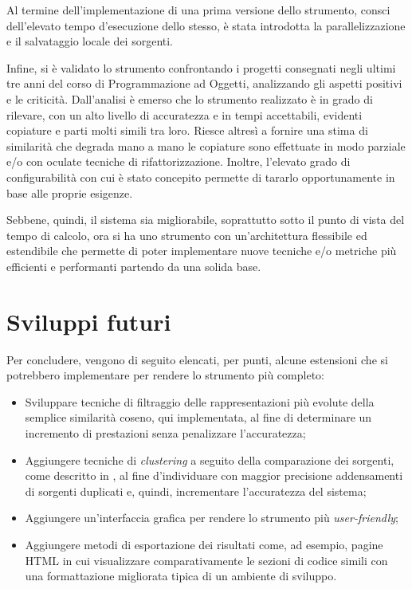 Al termine dell'implementazione di una prima versione dello strumento, consci dell'elevato tempo d'esecuzione dello stesso, è stata introdotta la parallelizzazione e il salvataggio locale dei sorgenti.

Infine, si è validato lo strumento confrontando i progetti consegnati negli ultimi tre anni del corso di Programmazione ad Oggetti, analizzando gli aspetti positivi e le criticità. 
%
Dall'analisi è emerso che lo strumento realizzato è in grado di rilevare, con un alto livello di accuratezza e in tempi accettabili, evidenti copiature e parti molti simili tra loro.
%
Riesce altresì a fornire una stima di similarità che degrada mano a mano le copiature sono effettuate in modo parziale e/o con oculate tecniche di rifattorizzazione.
%
Inoltre, l'elevato grado di configurabilità con cui è stato concepito permette di tararlo opportunamente in base alle proprie esigenze.

Sebbene, quindi, il sistema sia migliorabile, soprattutto sotto il punto di vista del tempo di calcolo, ora si ha uno strumento con un'architettura flessibile ed estendibile che permette di poter implementare nuove tecniche e/o metriche più efficienti e performanti partendo da una solida base.

\section{Sviluppi futuri}
Per concludere, vengono di seguito elencati, per punti, alcune estensioni che si potrebbero implementare per rendere lo strumento più completo:
\begin{itemize}
    \item Sviluppare tecniche di filtraggio delle rappresentazioni più evolute della semplice similarità coseno, qui implementata, al fine di determinare un incremento di prestazioni senza penalizzare l'accuratezza;
    \item Aggiungere tecniche di \textit{clustering} a seguito della comparazione dei sorgenti, come descritto in \cite{pdectet}, al fine d'individuare con maggior precisione addensamenti di sorgenti duplicati e, quindi, incrementare l'accuratezza del sistema;
    \item Aggiungere un'interfaccia grafica per rendere lo strumento più \textit{user-friendly};
    \item Aggiungere metodi di esportazione dei risultati come, ad esempio, pagine HTML in cui visualizzare comparativamente le sezioni di codice simili con una formattazione migliorata tipica di un ambiente di sviluppo.
\end{itemize}
